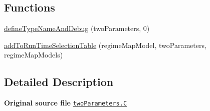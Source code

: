 \subsection*{Functions}
\begin{DoxyCompactItemize}
\item 
\hyperlink{namespaceFoam_1_1regimeMapModels_a829ba990737d74a279bc5e0932d17715}{define\+Type\+Name\+And\+Debug} (two\+Parameters, 0)
\item 
\hyperlink{namespaceFoam_1_1regimeMapModels_ae4d2ffaff96dc781f7ac62d7be3b544c}{add\+To\+Run\+Time\+Selection\+Table} (regime\+Map\+Model, two\+Parameters, regime\+Map\+Models)
\end{DoxyCompactItemize}


\subsection{Detailed Description}
{\bfseries Original source file} \href{../../../home/carlo/data/GeN-Foam/GeN-Foam_ffn/GeN-Foam/GeN-Foam/classes/thermalHydraulics/src/physicsModels/regimeMapModels/twoParameters/twoParameters.C}{\tt two\+Parameters.\+C} 